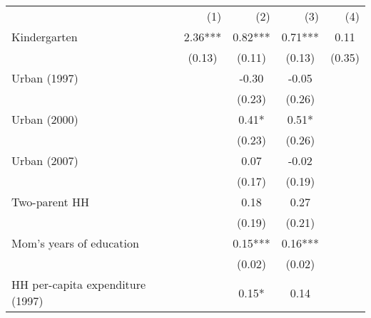 \begin{tabular}{lllll}
\cline{1-5}
\multicolumn{1}{c}{} &
  \multicolumn{1}{r}{(1)} &
  \multicolumn{1}{r}{(2)} &
  \multicolumn{1}{r}{(3)} &
  \multicolumn{1}{r}{(4)} \\
\cline{1-5}
\multicolumn{1}{l}{Kindergarten} &
  \multicolumn{1}{c}{2.36***} &
  \multicolumn{1}{c}{0.82***} &
  \multicolumn{1}{c}{0.71***} &
  \multicolumn{1}{c}{0.11 } \\
\multicolumn{1}{l}{} &
  \multicolumn{1}{c}{(0.13)} &
  \multicolumn{1}{c}{(0.11)} &
  \multicolumn{1}{c}{(0.13)} &
  \multicolumn{1}{c}{(0.35)} \\
\multicolumn{1}{l}{Urban (1997)} &
  \multicolumn{1}{c}{} &
  \multicolumn{1}{c}{-0.30 } &
  \multicolumn{1}{c}{-0.05 } &
  \multicolumn{1}{c}{} \\
\multicolumn{1}{l}{} &
  \multicolumn{1}{c}{} &
  \multicolumn{1}{c}{(0.23)} &
  \multicolumn{1}{c}{(0.26)} &
  \multicolumn{1}{c}{} \\
\multicolumn{1}{l}{Urban (2000)} &
  \multicolumn{1}{c}{} &
  \multicolumn{1}{c}{0.41* } &
  \multicolumn{1}{c}{0.51* } &
  \multicolumn{1}{c}{} \\
\multicolumn{1}{l}{} &
  \multicolumn{1}{c}{} &
  \multicolumn{1}{c}{(0.23)} &
  \multicolumn{1}{c}{(0.26)} &
  \multicolumn{1}{c}{} \\
\multicolumn{1}{l}{Urban (2007)} &
  \multicolumn{1}{c}{} &
  \multicolumn{1}{c}{0.07 } &
  \multicolumn{1}{c}{-0.02 } &
  \multicolumn{1}{c}{} \\
\multicolumn{1}{l}{} &
  \multicolumn{1}{c}{} &
  \multicolumn{1}{c}{(0.17)} &
  \multicolumn{1}{c}{(0.19)} &
  \multicolumn{1}{c}{} \\
\multicolumn{1}{l}{Two-parent HH} &
  \multicolumn{1}{c}{} &
  \multicolumn{1}{c}{0.18 } &
  \multicolumn{1}{c}{0.27 } &
  \multicolumn{1}{c}{} \\
\multicolumn{1}{l}{} &
  \multicolumn{1}{c}{} &
  \multicolumn{1}{c}{(0.19)} &
  \multicolumn{1}{c}{(0.21)} &
  \multicolumn{1}{c}{} \\
\multicolumn{1}{l}{Mom's years of education} &
  \multicolumn{1}{c}{} &
  \multicolumn{1}{c}{0.15***} &
  \multicolumn{1}{c}{0.16***} &
  \multicolumn{1}{c}{} \\
\multicolumn{1}{l}{} &
  \multicolumn{1}{c}{} &
  \multicolumn{1}{c}{(0.02)} &
  \multicolumn{1}{c}{(0.02)} &
  \multicolumn{1}{c}{} \\
\multicolumn{1}{l}{HH per-capita expenditure (1997)} &
  \multicolumn{1}{c}{} &
  \multicolumn{1}{c}{0.15* } &
  \multicolumn{1}{c}{0.14 } &

\end{tabular}
